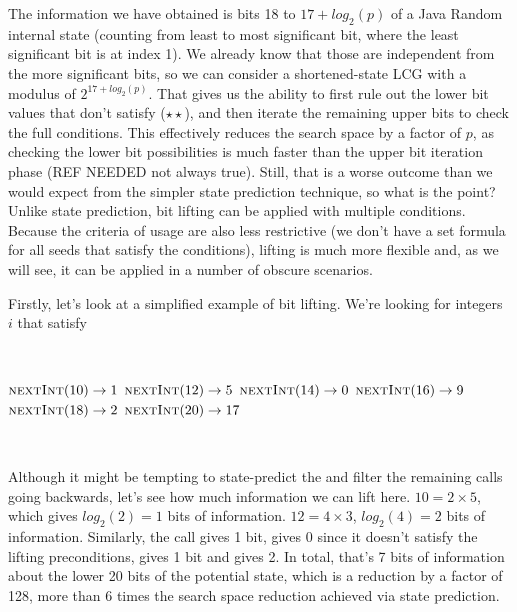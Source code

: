 \documentclass{article}
\begin{document}
The information we have obtained is bits 18 to $17 + log_2(p)$ of a Java Random internal state (counting from least to most significant bit, where the least significant bit is at index 1). We already know that those are independent from the more significant bits, so we can consider a shortened-state LCG with a modulus of $2^{17+log_2(p)}$. That gives us the ability to first rule out the lower bit values that don’t satisfy ($\star \star$), and then iterate the remaining upper bits to check the full conditions. This effectively reduces the search space by a factor of $p$, as checking the lower bit possibilities is much faster than the upper bit iteration phase (REF NEEDED not always true). Still, that is a worse outcome than we would expect from the simpler state prediction technique, so what is the point? Unlike state prediction, bit lifting can be applied with multiple conditions. Because the criteria of usage are also less restrictive (we don’t have a set formula for all seeds that satisfy the conditions), lifting is much more flexible and, as we will see, it can be applied in a number of obscure scenarios.

Firstly, let’s look at a simplified example of bit lifting. We’re looking for integers $i$ that satisfy

\
\begin{algorithmic}
\State {}
\State $\Call{nextInt}{10} \to 1$
\State $\Call{nextInt}{12} \to 5$
\State $\Call{nextInt}{14} \to 0$
\State $\Call{nextInt}{16} \to 9$
\State $\Call{nextInt}{18} \to 2$
\State $\Call{nextInt}{20} \to 17$
\end{algorithmic}
\ \

Although it might be tempting to state-predict the  and filter the remaining calls going backwards, let’s see how much information we can lift here. $10 = 2 \times 5$, which gives $log_2(2) = 1$ bits of information. $12 = 4 \times 3$, $log_2(4) = 2$ bits of information. Similarly, the  call gives 1 bit,  gives 0 since it doesn’t satisfy the lifting preconditions,  gives 1 bit and  gives 2. In total, that’s 7 bits of information about the lower 20 bits of the potential state, which is a reduction by a factor of 128, more than 6 times the search space reduction achieved via state prediction. %

\end{document}

